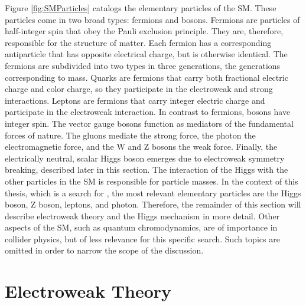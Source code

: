 Figure \ref{fig:SMParticles} catalogs the elementary particles of the SM. These particles come in two broad types: fermions and bosons. Fermions are particles of half-integer spin that obey 
the Pauli exclusion principle. They are, therefore, responsible for the structure of matter. 
Each fermion has a corresponding antiparticle that has opposite electrical charge, but is otherwise identical. 
The fermions are subdivided into two types in three generations, the generations corresponding to mass.
Quarks are fermions that carry both fractional electric charge and color charge, so they participate in the electroweak and strong interactions. 
Leptons are fermions that carry integer electric charge and participate in the electroweak interaction.
In contrast to fermions, bosons have integer spin. The vector gauge bosons function as mediators of the fundamental forces of nature. 
The gluons mediate the strong force, the photon the electromagnetic force, and the W and Z bosons the weak force. 
Finally, the electrically neutral, scalar Higgs boson emerges due to electroweak symmetry breaking, described later in this section. The interaction of the Higgs 
with the other particles in the SM is responsible for particle masses. 
In the context of this thesis, which is a search for \hzg{}, the most relevant elementary particles are the Higgs boson, Z boson, leptons, and photon. 
Therefore, the remainder of this section will describe electroweak theory and the Higgs mechanism in more detail. Other aspects of the SM, such as quantum chromodynamics, 
are of importance in collider physics, but of less relevance for this specific search. Such topics are omitted in order to narrow the scope of the discussion.

\section{Electroweak Theory}


